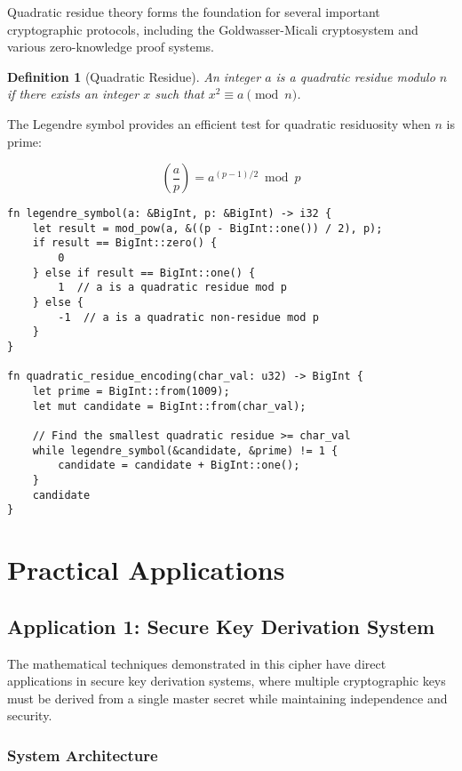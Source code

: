 \documentclass[12pt,a4paper]{article}
\newtheorem{definition}[theorem]{Definition}
\begin{document}
Quadratic residue theory forms the foundation for several important cryptographic protocols, including the Goldwasser-Micali cryptosystem and various zero-knowledge proof systems.

\begin{definition}[Quadratic Residue]
An integer $a$ is a quadratic residue modulo $n$ if there exists an integer $x$ such that $x^2 \equiv a \pmod{n}$.
\end{definition}

The Legendre symbol provides an efficient test for quadratic residuosity when $n$ is prime:

\begin{equation}
\left(\frac{a}{p}\right) = a^{(p-1)/2} \bmod p
\end{equation}

\begin{lstlisting}[caption={Legendre Symbol Computation}]
fn legendre_symbol(a: &BigInt, p: &BigInt) -> i32 {
    let result = mod_pow(a, &((p - BigInt::one()) / 2), p);
    if result == BigInt::zero() {
        0
    } else if result == BigInt::one() {
        1  // a is a quadratic residue mod p
    } else {
        -1  // a is a quadratic non-residue mod p
    }
}

fn quadratic_residue_encoding(char_val: u32) -> BigInt {
    let prime = BigInt::from(1009);
    let mut candidate = BigInt::from(char_val);
    
    // Find the smallest quadratic residue >= char_val
    while legendre_symbol(&candidate, &prime) != 1 {
        candidate = candidate + BigInt::one();
    }
    candidate
}
\end{lstlisting}

\section{Practical Applications}

\subsection{Application 1: Secure Key Derivation System}

The mathematical techniques demonstrated in this cipher have direct applications in secure key derivation systems, where multiple cryptographic keys must be derived from a single master secret while maintaining independence and security.

\subsubsection{System Architecture}
\end{document}
